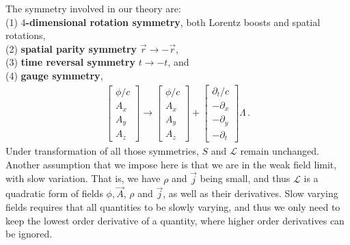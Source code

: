 \documentclass[11pt, onesided]{book}
\theoremstyle{break}
\theoremstyle{break}
\newcommand{\pd}{\partial}
\newcommand{\bmat}[1]{\begin{bmatrix} #1 \end{bmatrix}}
\begin{document}
The symmetry involved in our theory are: \\
${}$\quad(1) \textbf{$4$-dimensional rotation symmetry}, both Lorentz boosts and spatial rotations, \\
${}$\quad(2) \textbf{spatial parity symmetry} $\vec{r} \to -\vec{r}$, \\
${}$\quad(3) \textbf{time reversal symmetry} $t \to -t$, and \\
${}$\quad(4) \textbf{gauge symmetry}, 
\begin{align}
\bmat{\phi/c \\ A_x \\ A_y \\ A_z} \to \bmat{\phi/c \\ A_x \\ A_y \\ A_z} + \bmat{\pd_t/c \\ -\pd_x \\ -\pd_y \\ -\pd_t}\Lambda\,.
\end{align}
Under transformation of all those symmetries, $S$ and $\mathcal{L}$ remain unchanged. \\

Another assumption that we impose here is that we are in the weak field limit, with slow variation. That is, we have $\rho$ and $\vec{j}$ being small, and thus $\mathcal{L}$ is a quadratic form of fields $\phi, \vec{A}$, $\rho$ and $\vec{j}$, as well as their derivatives. Slow varying fields requires that all quantities to be slowly varying, and thus we only need to keep the lowest order derivative of a quantity, where higher order derivatives can be ignored.\\
\end{document}
